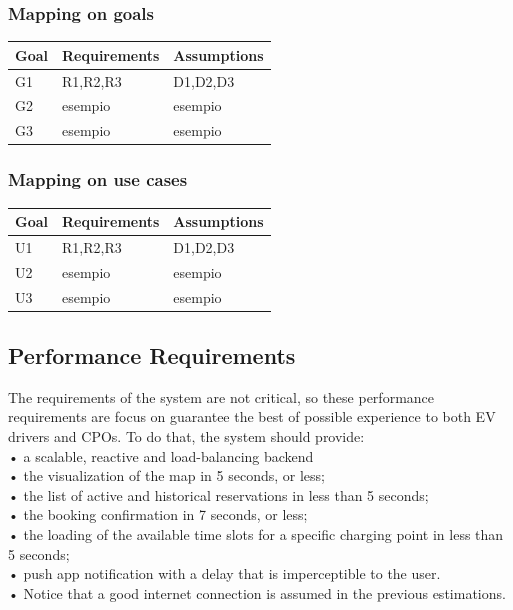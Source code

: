 \subsubsection{Mapping on goals}
\begin{table}[H]
    \begin{tabularx}{\textwidth}{XXX}
        \toprule
        \textbf{Goal} & \textbf{Requirements} & \textbf{Assumptions} \\ \midrule
        G1            & R1,R2,R3              & D1,D2,D3             \\
        G2            & esempio               & esempio              \\
        G3            & esempio               & esempio              \\ \bottomrule
    \end{tabularx}
\end{table}
\subsubsection{Mapping on use cases}
\begin{table}[H]
    \begin{tabularx}{\textwidth}{XXX}
        \toprule
        \textbf{Goal} & \textbf{Requirements} & \textbf{Assumptions} \\ \midrule
        U1            & R1,R2,R3              & D1,D2,D3             \\
        U2            & esempio               & esempio              \\
        U3            & esempio               & esempio              \\ \bottomrule
    \end{tabularx}
\end{table}

\subsection{Performance Requirements}
The requirements of the system are not critical, so these performance requirements
are focus on guarantee the best of possible experience to both EV drivers and CPOs.
To do that, the system should provide:
\\• a scalable, reactive and load-balancing backend
\\• the visualization of the map in 5 seconds, or less;
\\• the list of active and historical reservations in less than 5 seconds;
\\• the booking confirmation in 7 seconds, or less;
\\• the loading of the available time slots for a specific charging point in less than 5 seconds;
\\• push app notification with a delay that is imperceptible to the user.
\\• Notice that a good internet connection is assumed in the previous estimations.


